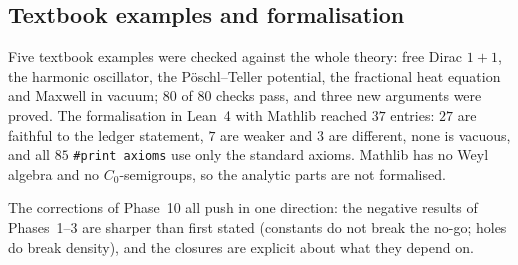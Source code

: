 \subsection{Textbook examples and formalisation}

Five textbook examples were checked against the whole theory: free Dirac $1+1$, the harmonic oscillator, the P\"oschl--Teller potential, the fractional heat equation and Maxwell in vacuum; $80$ of $80$ checks pass, and three new arguments were proved. The formalisation in Lean~4 with Mathlib reached $37$ entries: $27$ are faithful to the ledger statement, $7$ are weaker and $3$ are different, none is vacuous, and all $85$ \texttt{\#print axioms} use only the standard axioms. Mathlib has no Weyl algebra and no $C_0$-semigroups, so the analytic parts are not formalised.

\begin{takeaway}
The corrections of Phase~10 all push in one direction: the negative results of Phases~1--3 are sharper than first stated (constants do not break the no-go; holes do break density), and the closures are explicit about what they depend on.
\end{takeaway}
